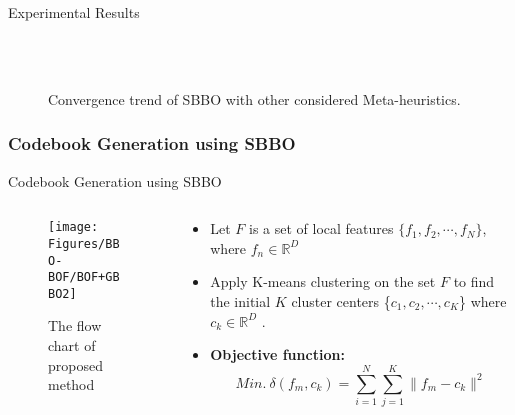 \documentclass [9pt,times] {beamer}
\begin{document}
\begin{frame}{Experimental Results}
      \fontsize{8pt}{10pt}\selectfont

\begin{figure}
    \centering
{} 
\\
\\
 \caption{\scriptsize Convergence trend of SBBO with other considered Meta-heuristics.}
\label{fig:cg}
\end{figure}
  
  

  
  
\end{frame}




\subsubsection{Codebook Generation using SBBO}
\begin{frame}[fragile]{Codebook Generation using SBBO}
\begin{columns}
\begin{column}{7cm}
\begin{figure}
		\centering
		\texttt{[image: Figures/BBO-BOF/BOF+GBBO2]}
		\caption{The flow chart of proposed method}
		\label{fig:flowchart}
\end{figure}
\end{column}

\begin{column}{4.2cm}
\begin{itemize}
\scriptsize
\justifying
\item Let $F$ is a set of local features $\{f_1, f_2, \cdots, f_N\}$, where $f_n \in \mathbb{R}^D$
\item Apply K-means clustering on the set $F$ to find the initial $K$ cluster centers \{$c_1, c_2, \cdots, c_K$\} where $c_k \in \mathbb{R}^D$ . 
\item \textbf{Objective function:}
\begin{equation*}\label{eq:fitness} 
Min.  \ \delta(f_m, c_k)   =  \sum_{i=1}^N \sum_{j=1}^K \parallel f_m - c_k \parallel ^2
\end{equation*}
\end{itemize}
\end{column}
\end{columns}
\end{frame}
\end{document}
